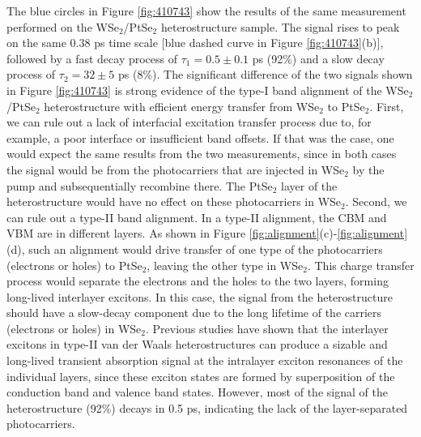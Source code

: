 \documentclass[10pt]{iopart}
\begin{document}
The blue circles in Figure \ref{fig:410743} show the results of the same measurement performed on the WSe$_2$/PtSe$_2$ heterostructure sample. The signal rises to peak on the same 0.38 ps time scale [blue dashed curve in Figure \ref{fig:410743}(b)], followed by a fast decay process of $\tau_1 = 0.5 \pm 0.1$ ps (92\%) and a slow decay process of  $\tau_2 = 32 \pm 5$ ps (8\%). The significant difference of the two signals shown in Figure \ref{fig:410743} is strong evidence of the type-I band alignment of the WSe$_2$/PtSe$_2$ heterostructure with efficient energy transfer from WSe$_2$ to PtSe$_2$. First, we can rule out a lack of interfacial excitation transfer process due to, for example, a poor interface or insufficient band offsets. If that was the case, one would expect the same results from the two measurements, since in both cases the signal would be from the photocarriers that are injected in WSe$_2$ by the pump and subsequentially recombine there. The PtSe$_2$ layer of the heterostructure would have no effect on these photocarriers in WSe$_2$. Second, we can rule out a type-II band alignment. In a type-II alignment, the CBM and VBM are in different layers. As shown in Figure \ref{fig:alignment}(c)-\ref{fig:alignment}(d), such an alignment would drive transfer of one type of the photocarriers (electrons or holes) to PtSe$_2$, leaving the other type in WSe$_2$. This charge transfer process would separate the electrons and the holes to the two layers, forming long-lived interlayer excitons. In this case, the signal from the heterostructure should have a slow-decay component due to the long lifetime of the carriers (electrons or holes) in WSe$_2$\cite{peng2016ultrafast,wang2016interlayer}. Previous studies have shown that the interlayer excitons in type-II van der Waals heterostructures can produce a sizable and long-lived transient absorption signal at the intralayer exciton resonances of the individual layers, since these exciton states are formed by superposition of the conduction band and valence band states\cite{ceballos2014ultrafast,hong2014ultrafast}. However, most of the signal of the heterostructure (92\%) decays in 0.5 ps, indicating the lack of the layer-separated photocarriers.
\end{document}

